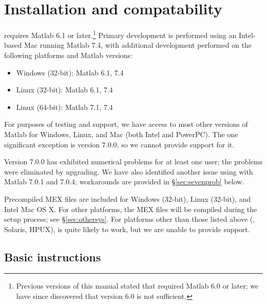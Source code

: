 \documentclass[12pt]{article}
\begin{document}
\newpage
\appendix

\section{Installation and compatability}
\label{s-installing}

\cvx requires Matlab 6.1 or later.\footnote{Previous
versions of this manual stated that \cvx required Matlab
6.0 or later; we have since discovered that version 6.0
is not sufficient.} Primary \cvx development is performed using
an Intel-based Mac running Matlab 7.4, with additional
development performed on the following platforms and Matlab versions:
\begin{itemize}
\item Windows (32-bit): Matlab 6.1, 7.4
\item Linux (32-bit): Matlab 6.1, 7.4
\item Linux (64-bit): Matlab 7.1, 7.4
\end{itemize}
For purposes of testing and support, we have access to most
other versions of Matlab for Windows, Linux, and Mac (both
Intel and PowerPC). The one significant exception is version 7.0.0,
so we cannot provide support for it. 

Version 7.0.0 has exhibited numerical problems for at least one user;
the problems were eliminated by upgrading.
We have also identified another issue using \cvx
with Matlab 7.0.1 and 7.0.4; workarounds
are provided in \S\ref{sec:sevenprob} below. 

Precompiled MEX files are included for Windows (32-bit), Linux (32-bit),
and Intel Mac OS X.
For other platforms, the MEX files will be compiled during the setup
process; see
\S\ref{sec:othersys}. For platforms other than those
listed above (\eg, Solaris, HPUX), \cvx is quite likely to work,
but we are unable to provide support.

\subsection{Basic instructions}
\label{sec:winlin}
\end{document}
